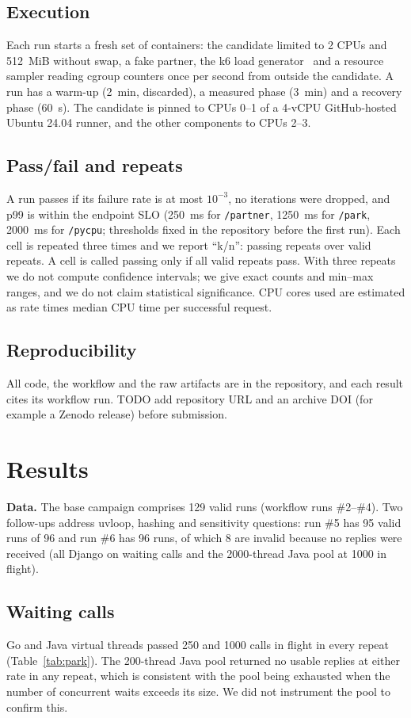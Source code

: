 \documentclass[journal]{IEEEtran}
\begin{document}
\subsection{Execution}
Each run starts a fresh set of containers: the candidate limited to 2 CPUs and 512~MiB without swap, a fake partner, the k6 load generator~\cite{k6} and a resource sampler reading cgroup counters once per second from outside the candidate. A run has a warm-up (2~min, discarded), a measured phase (3~min) and a recovery phase (60~s). The candidate is pinned to CPUs 0--1 of a 4-vCPU GitHub-hosted Ubuntu 24.04 runner, and the other components to CPUs 2--3.
\subsection{Pass/fail and repeats}
A run passes if its failure rate is at most $10^{-3}$, no iterations were dropped, and p99 is within the endpoint SLO (250~ms for \texttt{/partner}, 1250~ms for \texttt{/park}, 2000~ms for \texttt{/pycpu}; thresholds fixed in the repository before the first run). Each cell is repeated three times and we report ``k/n'': passing repeats over valid repeats. A cell is called passing only if all valid repeats pass. With three repeats we do not compute confidence intervals; we give exact counts and min--max ranges, and we do not claim statistical significance. CPU cores used are estimated as rate times median CPU time per successful request.
\subsection{Reproducibility}
All code, the workflow and the raw artifacts are in the repository, and each result cites its workflow run. TODO add repository URL and an archive DOI (for example a Zenodo release) before submission.

\section{Results}
\textbf{Data.} The base campaign comprises 129 valid runs (workflow runs \#2--\#4). Two follow-ups address uvloop, hashing and sensitivity questions: run \#5 has 95 valid runs of 96 and run \#6 has 96 runs, of which 8 are invalid because no replies were received (all Django on waiting calls and the 2000-thread Java pool at 1000 in flight).
\subsection{Waiting calls}

Go and Java virtual threads passed 250 and 1000 calls in flight in every repeat (Table~\ref{tab:park}). The 200-thread Java pool returned no usable replies at either rate in any repeat, which is consistent with the pool being exhausted when the number of concurrent waits exceeds its size. We did not instrument the pool to confirm this.
\end{document}
